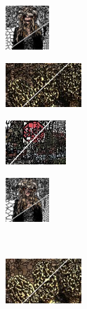 \begin{figure}
\begin{subfigure}[b]{0.129\textwidth}
	\end{subfigure}
	\begin{subfigure}[b]{0.10\textwidth}
		\includegraphics[height=1.65cm]{pictures/fash/etps/cropped/etps_132_contours}
	\end{subfigure}
	\begin{subfigure}[b]{0.02\textwidth}
	\end{subfigure}
	\begin{subfigure}[b]{0.16\textwidth}
		\includegraphics[height=1.65cm]{pictures/bsds500/lsc/cropped/lsc_208078_contours}
	\end{subfigure}
	\begin{subfigure}[b]{0.129\textwidth}
		\includegraphics[height=1.65cm]{pictures/sbd/lsc/cropped/lsc_6000067_contours}
	\end{subfigure}
	\begin{subfigure}[b]{0.10\textwidth}
		\includegraphics[height=1.65cm]{pictures/fash/lsc/cropped/lsc_132_contours}
	\end{subfigure}\\
	\begin{subfigure}[b]{0.02\textwidth}
	\end{subfigure}
	\begin{subfigure}[b]{0.16\textwidth}
		\includegraphics[height=1.65cm]{pictures/bsds500/poise/cropped/poise_208078_contours}

\end{subfigure}
\end{figure}
